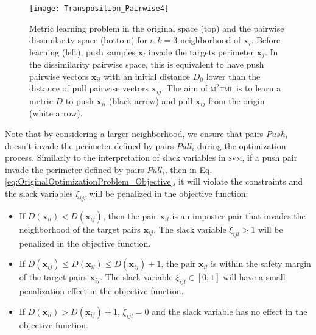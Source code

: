 \begin{figure}[h!]
	\centering
	\texttt{[image: Transposition\_Pairwise4]}
	\caption[\textsc{m$^2$tml} problem in the original space (top) and the pairwise dissimilarity space (bottom) for a $k=3$ neighborhood of $\textbf{x}_i$.]{Metric learning problem in the original space (top) and the pairwise dissimilarity space (bottom) for a $k=3$ neighborhood of $\textbf{x}_i$. Before learning (left), push samples $\textbf{x}_l$ invade the targets perimeter $\textbf{x}_j$. In the dissimilarity pairwise space, this is equivalent to have push pairwise vectors $\textbf{x}_{il}$ with an initial distance $D_0$ lower than the distance of pull pairwise vectors $\textbf{x}_{ij}$. The aim of \textsc{m$^2$tml} is to learn a metric $D$ to push $\textbf{x}_{il}$ (black arrow) and pull $\textbf{x}_{ij}$ from the origin (white arrow).}
	\label{fig:Transposition_Pairwise}
\end{figure}
\noindent Note that by considering a larger neighborhood, we ensure that pairs $Push_i$ doesn't invade the perimeter defined by pairs $Pull_i$ during the optimization process. Similarly to the interpretation of slack variables in \textsc{svm}, if a push pair invade the perimeter defined by pairs $Pull_i$, then in Eq. \ref{eq:OriginalOptimizationProblem_Objective}, it will violate the constraints and the slack variables $\xi_{ijl}$ will be penalized in the objective function:
\begin{itemize}
	\item If $D(\textbf{x}_{il}) < D(\textbf{x}_{ij})$, then the pair $\textbf{x}_{il}$ is an imposter pair that invades the neighborhood of the target pairs $\textbf{x}_{ij}$. The slack variable  $\xi_{ijl} > 1$ will be penalized in the objective function. 
	\item If $D(\textbf{x}_{ij}) \leq D(\textbf{x}_{il}) \leq D(\textbf{x}_{ij})+1$, the pair $\textbf{x}_{il}$ is within the safety margin of the target pairs $\textbf{x}_{ij}$. The slack variable $ \xi_{ijl} \in [0;1]$ will have a small penalization effect in the objective function.
	\item If $D(\textbf{x}_{il}) > D(\textbf{x}_{ij}) +1$, $\xi_{ijl} = 0$ and the slack variable has no effect in the objective function.
\end{itemize}




